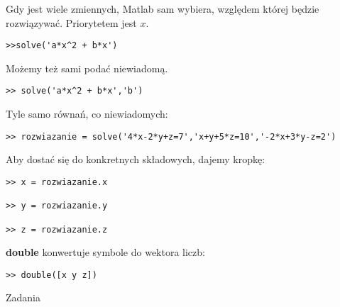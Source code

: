 \documentclass[12pt]{amsbook}
\theoremstyle{definition}
\begin{document}
Gdy jest wiele zmiennych, Matlab sam wybiera, względem której będzie rozwiązywać.
Priorytetem jest $x$.

\begin{lstlisting}
>>solve('a*x^2 + b*x')
\end{lstlisting}

Możemy też sami podać niewiadomą.

\begin{lstlisting}
>> solve('a*x^2 + b*x','b')
\end{lstlisting}

Tyle samo równań, co niewiadomych:

\begin{lstlisting}
>> rozwiazanie = solve('4*x-2*y+z=7','x+y+5*z=10','-2*x+3*y-z=2')
\end{lstlisting}

Aby dostać się do konkretnych składowych, dajemy kropkę:

\begin{lstlisting}
>> x = rozwiazanie.x

>> y = rozwiazanie.y

>> z = rozwiazanie.z
\end{lstlisting}

\textbf{double} konwertuje symbole do wektora liczb:

\begin{lstlisting}
>> double([x y z])
\end{lstlisting}


Zadania\\
\end{document}

